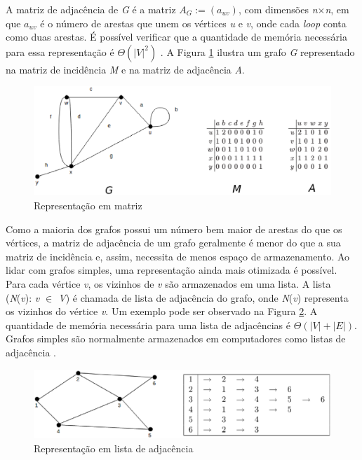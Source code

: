 A matriz de adjacência de \textit{G} é a matriz $A_G := (a_{uv})$, com dimensões \textit{n$\times$n}, em que $a_{uv}$ é o número de arestas que unem os vértices \textit{u} e \textit{v}, onde cada \textit{loop} conta como duas arestas. É possível verificar que a quantidade de memória necessária para essa representação é $\Theta(|\textit{V}|^2)$ \cite{Bondy:2007}. A Figura \ref{matriz} ilustra um grafo \textit{G} representado na matriz de incidência \textit{M} e na matriz de adjacência \textit{A}.

\begin{figure}[!h]
	\centering
	\includegraphics[scale=0.6]{figuras/capitulo2/matriz.eps}
	\caption{Representação em matriz}
	\label{matriz}
\end{figure}

Como a maioria dos grafos possui um número bem maior de arestas do que os vértices, a matriz de adjacência de um grafo geralmente é menor do que a sua matriz de incidência e, assim, necessita de menos espaço de armazenamento. Ao lidar com grafos simples, uma representação ainda mais otimizada é possível. Para cada vértice \textit{v}, os vizinhos de \textit{v} são armazenados em uma lista. A lista (\textit{N}(\textit{v}): \textit{v $\in$ V}) é chamada de lista de adjacência do grafo, onde \textit{N}(\textit{v}) representa os vizinhos do vértice \textit{v}. Um exemplo pode ser observado na Figura \ref{lista_adjacencia}. A quantidade de memória necessária para uma lista de adjacências é $\Theta(|\textit{V}| + |\textit{E}|)$. Grafos simples são normalmente armazenados em computadores como listas de adjacência \cite{Costa:2011}.

\newpage

\begin{figure}[!h]
	\centering
	\includegraphics[scale=0.3]{figuras/capitulo2/lista_adjacencia.eps}
	\caption{Representação em lista de adjacência}
	\label{lista_adjacencia}
\end{figure}

